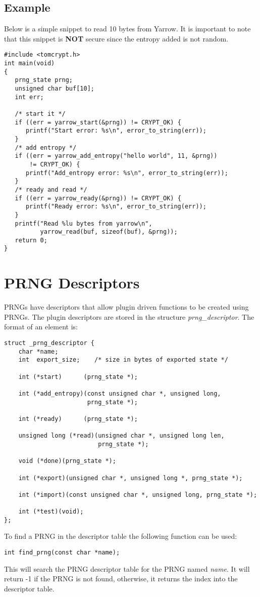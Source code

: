 \documentclass[synpaper]{book}
\newcommand{\mysection}[1]    %
	{                   %
	\section{#1}
   \markboth{\textsf{www.libtom.org}}{\thesection ~ {#1}}
	}
\begin{document}
\subsection{Example}
Below is a simple snippet to read 10 bytes from Yarrow.  It is important to note that this snippet is {\bf NOT} secure since 
the entropy added is not random.

\begin{verbatim}
#include <tomcrypt.h>
int main(void)
{
   prng_state prng;
   unsigned char buf[10];
   int err;
   
   /* start it */
   if ((err = yarrow_start(&prng)) != CRYPT_OK) {
      printf("Start error: %s\n", error_to_string(err));
   }
   /* add entropy */
   if ((err = yarrow_add_entropy("hello world", 11, &prng)) 
       != CRYPT_OK) {
      printf("Add_entropy error: %s\n", error_to_string(err));
   }
   /* ready and read */
   if ((err = yarrow_ready(&prng)) != CRYPT_OK) {
      printf("Ready error: %s\n", error_to_string(err));
   }
   printf("Read %lu bytes from yarrow\n", 
          yarrow_read(buf, sizeof(buf), &prng));
   return 0;
}
\end{verbatim}

\mysection{PRNG Descriptors}
PRNGs have descriptors that allow plugin driven functions to be created using PRNGs. The plugin descriptors are stored in the structure \textit{prng\_descriptor}.  The 
format of an element is:
\begin{verbatim}
struct _prng_descriptor {
    char *name;
    int  export_size;    /* size in bytes of exported state */

    int (*start)      (prng_state *);

    int (*add_entropy)(const unsigned char *, unsigned long, 
                       prng_state *);

    int (*ready)      (prng_state *);

    unsigned long (*read)(unsigned char *, unsigned long len, 
                          prng_state *);

    void (*done)(prng_state *);

    int (*export)(unsigned char *, unsigned long *, prng_state *);

    int (*import)(const unsigned char *, unsigned long, prng_state *);

    int (*test)(void);
};
\end{verbatim}

To find a PRNG in the descriptor table the following function can be used:
\begin{verbatim}
int find_prng(const char *name);
\end{verbatim}
This will search the PRNG descriptor table for the PRNG named \textit{name}.  It will return -1 if the PRNG is not found, otherwise, it returns
the index into the descriptor table.
\end{document}
